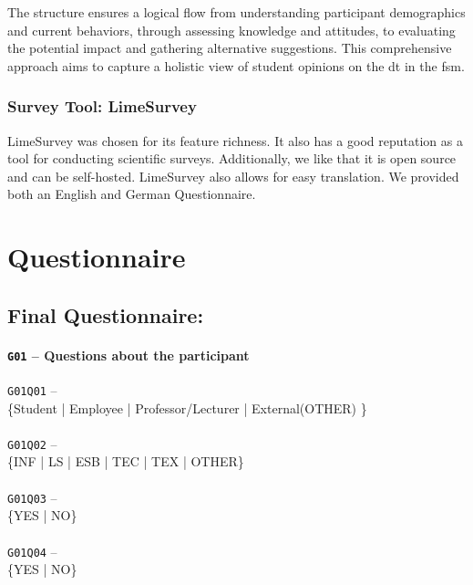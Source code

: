 The structure ensures a logical flow from understanding participant demographics and current behaviors, through assessing knowledge and attitudes, to evaluating the potential impact and gathering alternative suggestions. This comprehensive approach aims to capture a holistic view of student opinions on the \gls{dt} in the \gls{fsm}.
\subsection{Survey Tool: LimeSurvey}
LimeSurvey was chosen for its feature richness. It also has a good reputation as a tool for conducting scientific surveys. Additionally, we like that it is open source and can be self-hosted. LimeSurvey also allows for easy translation. We provided both an English and German Questionnaire.
\pagebreak
\chapter{Questionnaire}

\section{Final Questionnaire:}

\subsubsection{\texttt{G01} -- Questions about the participant}
\begin{displayquote}
    \texttt{G01Q01} -- \\
    \{Student | Employee | Professor/Lecturer | External(OTHER) \}\\\\
    \texttt{G01Q02} -- \\
    \{INF | LS | ESB | TEC | TEX | OTHER\}\\\\
    \texttt{G01Q03} -- \\
    \{YES | NO\}\\\\
    \texttt{G01Q04} -- \\
    \{YES | NO\}\\\\
\end{displayquote}

